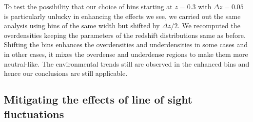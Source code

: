 \documentclass[twocolumn,useAMS,usenatbib]{mn2e}
\begin{document}
To test the possibility that our choice of bins starting at $z=0.3$ with $\Delta z = 0.05$ is particularly unlucky in enhancing the effects we see, 
we carried out the same analysis using bins of the same width but shifted by $\Delta z/2$. We recomputed the overdensities keeping the parameters of the redshift distributions same as before.
Shifting the bins enhances the overdensities and underdensities in some cases and in other cases, it mixes the overdense and underdense regions to make them more neutral-like. 
The environmental trends still are observed in the enhanced bins and hence our conclusions are still applicable. 

\subsection{Mitigating the effects of line of sight fluctuations}\label{sec:mitigation}
\end{document}
